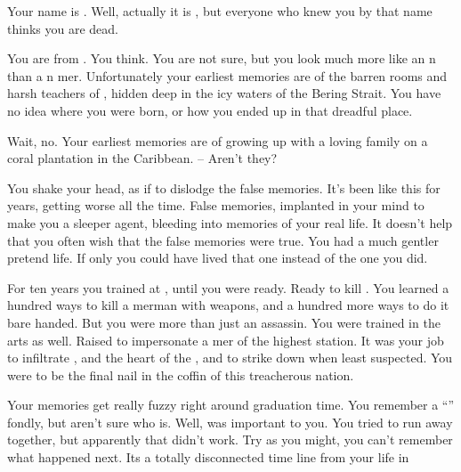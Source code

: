 \documentclass[char]{NeptuneBall}
\begin{document}
\name{\cAthena{}}




Your name is \cQueen{\MYname}. Well, actually it is \cQueen{}, but everyone who knew you by that name thinks you are dead.

You are from \pAtlantis{}. You think. You are not sure, but you look much more like an \pAtlantis{}n than a \pPacifica{}n mer\cQueen{\human{}}. Unfortunately your earliest memories are of the barren rooms and harsh teachers of \pAssassin{}, hidden deep in the icy waters of the Bering Strait. You have no idea where you were born, or how you ended up in that dreadful place. 

Wait, no. Your earliest memories are of growing up with a loving family on a coral plantation in the Caribbean. -- Aren't they?

You shake your head, as if to dislodge the false memories. It's been like this for years, getting worse all the time. False memories, implanted in your mind to make you a sleeper agent, bleeding into memories of your real life. It doesn't help that you often wish that the false memories were true. You had a much gentler pretend life. If only you could have lived that one instead of the one you did.

For ten years you trained at \pAssassin{}, until you were ready. Ready to kill \cKing{\King} \cKing{}. You learned a hundred ways to kill a merman with weapons, and a hundred more ways to do it bare handed. But you were more than just an assassin. You were trained in the arts as well. Raised to impersonate a mer\cAthena{\human} of the highest station. It was your job to infiltrate \pAtlantis{}, and the heart of the \cKing{\King}, and to strike \cKing{\them} down when \pAtlantis{} least suspected. You were to be the final nail in the coffin of this treacherous nation.

Your memories get really fuzzy right around graduation time.  You remember a ``\cDiplomat{}'' fondly, but aren't sure who \cDiplomat{\they} is. Well, \cDiplomat{\they} was important to you. You tried to run away together, but apparently that didn't work. Try as you might, you can't remember what happened next. Its a totally disconnected time line from your life in \pAtlantis{}
\end{document}
